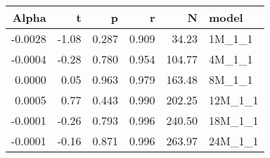 \begin{table}[ht]
\centering
\begin{tabular}{rrrrrl}
  \hline
Alpha & t & p & r & N & model \\ 
  \hline
-0.0028 & -1.08 & 0.287 & 0.909 & 34.23 & 1M\_1\_1 \\ 
  -0.0004 & -0.28 & 0.780 & 0.954 & 104.77 & 4M\_1\_1 \\ 
  0.0000 & 0.05 & 0.963 & 0.979 & 163.48 & 8M\_1\_1 \\ 
  0.0005 & 0.77 & 0.443 & 0.990 & 202.25 & 12M\_1\_1 \\ 
  -0.0001 & -0.26 & 0.793 & 0.996 & 240.50 & 18M\_1\_1 \\ 
  -0.0001 & -0.16 & 0.871 & 0.996 & 263.97 & 24M\_1\_1 \\ 
   \hline
\end{tabular}
\end{table}

